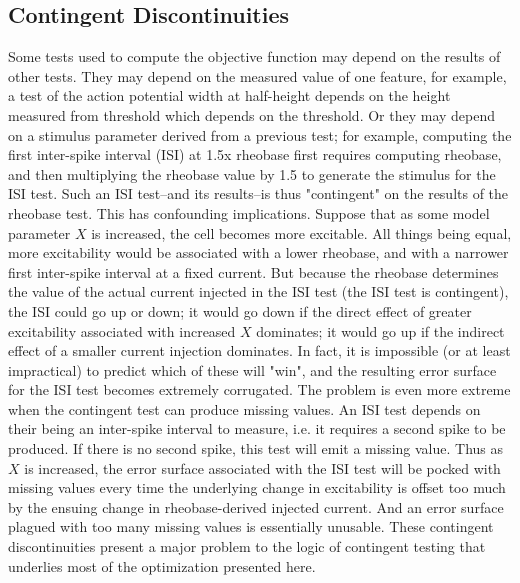 \subsection{Contingent Discontinuities}
\label{fig:contingent_discontinous}
Some tests used to compute the objective function may depend on the results of other tests.
They may depend on the measured value of one feature, for example, a test of the action potential width at half-height depends on the height measured from threshold which depends on the threshold.
Or they may depend on a stimulus parameter derived from a previous test; for example, computing the first inter-spike interval (ISI) at 1.5x rheobase first requires computing rheobase, and then multiplying the rheobase value by 1.5 to generate the stimulus for the ISI test.
Such an ISI test--and its results--is thus "contingent" on the results of the rheobase test.
This has confounding implications.
Suppose that as some model parameter $X$ is increased, the cell becomes more excitable.
All things being equal, more excitability would be associated with a lower rheobase, and with a narrower first inter-spike interval at a fixed current.
But because the rheobase determines the value of the actual current injected in the ISI test (the ISI test is contingent), the ISI could go up or down; it would go down if the direct effect of greater excitability associated with increased $X$ dominates; it would go up if the indirect effect of a smaller current injection dominates.
In fact, it is impossible (or at least impractical) to predict which of these will "win", and the resulting error surface for the ISI test becomes extremely corrugated.
The problem is even more extreme when the contingent test can produce missing values.
An ISI test depends on their being an inter-spike interval to measure, i.e. it requires a second spike to be produced.
If there is no second spike, this test will emit a missing value.
Thus as $X$ is increased, the error surface associated with the ISI test will be pocked with missing values every time the underlying change in excitability is offset too much by the ensuing change in rheobase-derived injected current.
And an error surface plagued with too many missing values is essentially unusable.
These contingent discontinuities present a major problem to the logic of contingent testing that underlies most of the optimization presented here.

